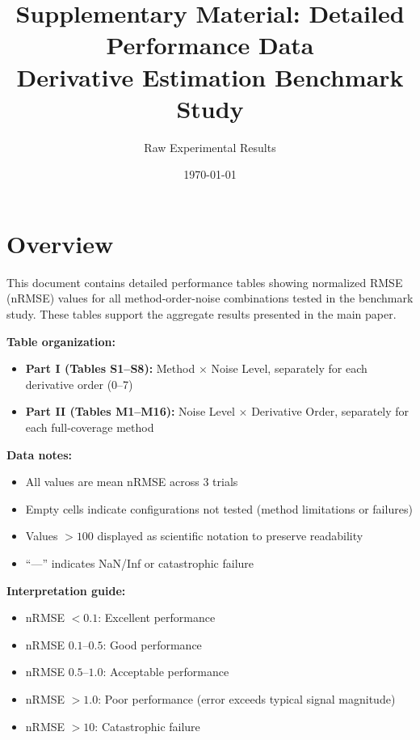 \documentclass[10pt]{article}
\title{Supplementary Material: Detailed Performance Data\\
Derivative Estimation Benchmark Study}
\author{Raw Experimental Results}
\date{\today}
\begin{document}
\maketitle

\section*{Overview}

This document contains detailed performance tables showing normalized RMSE (nRMSE) values for all method-order-noise combinations tested in the benchmark study. These tables support the aggregate results presented in the main paper.

\textbf{Table organization:}
\begin{itemize}
    \item \textbf{Part I (Tables S1--S8):} Method $\times$ Noise Level, separately for each derivative order (0--7)
    \item \textbf{Part II (Tables M1--M16):} Noise Level $\times$ Derivative Order, separately for each full-coverage method
\end{itemize}

\textbf{Data notes:}
\begin{itemize}
    \item All values are mean nRMSE across 3 trials
    \item Empty cells indicate configurations not tested (method limitations or failures)
    \item Values $>100$ displayed as scientific notation to preserve readability
    \item ``---'' indicates NaN/Inf or catastrophic failure
\end{itemize}

\textbf{Interpretation guide:}
\begin{itemize}
    \item nRMSE $< 0.1$: Excellent performance
    \item nRMSE $0.1$--$0.5$: Good performance
    \item nRMSE $0.5$--$1.0$: Acceptable performance
    \item nRMSE $> 1.0$: Poor performance (error exceeds typical signal magnitude)
    \item nRMSE $> 10$: Catastrophic failure
\end{itemize}

\clearpage

\end{document}
